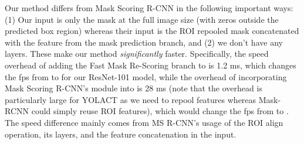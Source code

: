 \documentclass[10pt,journal,compsoc]{IEEEtran}
\begin{document}
Our method differs from Mask Scoring R-CNN \cite{huang-msrcnn2018} in the following important ways: (1) Our input is only the mask at the full image size (with zeros outside the predicted box region) whereas their input is the ROI repooled mask concatenated with the feature from the mask prediction branch, and (2) we don't have any  layers. These make our method \emph{significantly} faster. Specifically, the speed overhead of adding the Fast Mask Re-Scoring branch to \methodname{} is 1.2 ms, which changes the fps from  to  for our ResNet-101 model, while the overhead of incorporating Mask Scoring R-CNN's module into \methodname{} is 28 ms (note that the overhead is particularly large for YOLACT as we need to repool features whereas Mask-RCNN could simply reuse ROI features), which would change the fps from  to . The speed difference mainly comes from MS R-CNN's usage of the ROI align operation, its  layers, and the feature concatenation in the input.
\end{document}
